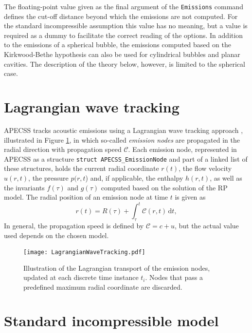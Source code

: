 The floating-point value given as the final argument of the {\tt Emissions} command defines the cut-off distance beyond which the emissions are not computed. For the standard incompressible assumption this value has no meaning, but a value is required as a dummy to facilitate the correct reading of the options. In addition to the emissions of a spherical bubble, the emissions computed based on the Kirkwood-Bethe hypothesis can also be used for cylindrical bubbles and planar cavities. The description of the theory below, however, is limited to the spherical case.

\section{Lagrangian wave tracking}

APECSS tracks acoustic emissions using a Lagrangian wave tracking approach \citep{Denner2023}, illustrated in Figure \ref{fig:lagrangiantracking}, in which so-called \textit{emission nodes} are propagated in the radial direction with propagation speed $\mathcal{C}$. Each emission node, represented in APECSS as a structure {\tt struct APECSS\_EmissionNode} and part of a linked list of these structures, holds the current radial coordinate $r(t)$, the flow velocity $u(r,t)$, the pressure $p(r,t$) and, if applicable, the enthalpy $h(r,t)$, as well as the invariants $f(\tau)$ and $g(\tau)$ computed based on the solution of the RP model. The radial position of an emission node at time $t$ is given as
\begin{equation}
    r(t) = R(\tau) + \int_\tau^t \mathcal{C}(r,t) \, \mathrm{d}t, 
    \label{eq:r_t}
\end{equation}
In general, the propagation speed is defined by $\mathcal{C}=c+u$, but the actual value used depends on the chosen model.

\begin{figure}
    \begin{center}
    \texttt{[image: LagrangianWaveTracking.pdf]}
    \caption{Illustration of the Lagrangian transport of the emission nodes, updated at each discrete time instance $t_i$. Nodes that pass a predefined maximum radial coordinate are discarded.}
    \label{fig:lagrangiantracking}
    \end{center}
\end{figure}

\section{Standard incompressible model}
\label{sec:emissionsic}

